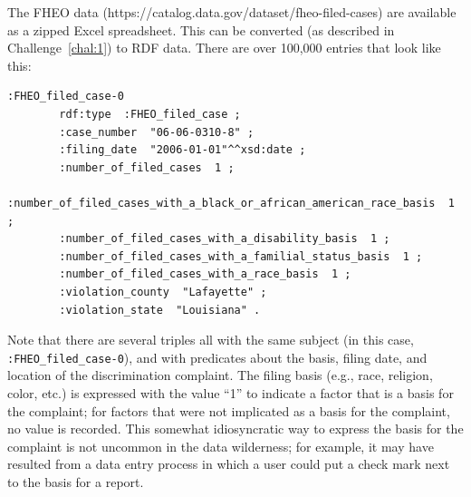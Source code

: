 The FHEO data (https://catalog.data.gov/dataset/fheo-filed-cases) are available 
as a zipped Excel spreadsheet. This can be converted (as described in Challenge~\ref{chal:1}) to RDF data. 
There are over
100,000 entries that look like this:

\begin{lstlisting}
:FHEO_filed_case-0
        rdf:type  :FHEO_filed_case ;
        :case_number  "06-06-0310-8" ;
        :filing_date  "2006-01-01"^^xsd:date ;
        :number_of_filed_cases  1 ;
        :number_of_filed_cases_with_a_black_or_african_american_race_basis  1 ;
        :number_of_filed_cases_with_a_disability_basis  1 ;
        :number_of_filed_cases_with_a_familial_status_basis  1 ;
        :number_of_filed_cases_with_a_race_basis  1 ;
        :violation_county  "Lafayette" ;
        :violation_state  "Louisiana" .
\end{lstlisting}

Note that
there are several triples all with the same subject (in this case,
\texttt{:FHEO\_filed\_case-0}), and with  predicates about the basis, filing date, and
location of the discrimination complaint. The filing basis (e.g., race,
religion, color, etc.) is expressed with the value ``1'' to indicate a
factor that is a basis for the complaint; for factors that were not implicated
as a basis for the complaint, no value is recorded. This somewhat idiosyncratic
way to express the basis for the complaint is not uncommon in the data
wilderness; for example, it may have resulted from a data entry process
in which a user could put a check mark next to the basis for a report.

